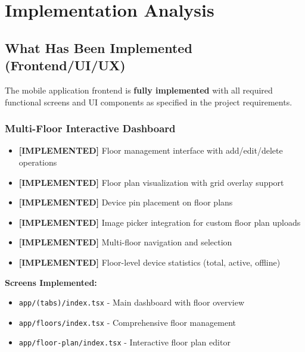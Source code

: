 \documentclass[12pt,a4paper]{article}
\begin{document}
\newpage
\section{Implementation Analysis}

\subsection{What Has Been Implemented (Frontend/UI/UX)}


The mobile application frontend is \textbf{fully implemented} with all required functional screens and UI components as specified in the project requirements.

\subsubsection{Multi-Floor Interactive Dashboard}
\begin{itemize}[leftmargin=*]
    \item \textcolor{implemented}{\textbf{[IMPLEMENTED]}} Floor management interface with add/edit/delete operations
    \item \textcolor{implemented}{\textbf{[IMPLEMENTED]}} Floor plan visualization with grid overlay support
    \item \textcolor{implemented}{\textbf{[IMPLEMENTED]}} Device pin placement on floor plans
    \item \textcolor{implemented}{\textbf{[IMPLEMENTED]}} Image picker integration for custom floor plan uploads
    \item \textcolor{implemented}{\textbf{[IMPLEMENTED]}} Multi-floor navigation and selection
    \item \textcolor{implemented}{\textbf{[IMPLEMENTED]}} Floor-level device statistics (total, active, offline)
\end{itemize}

\textbf{Screens Implemented:}
\begin{itemize}
    \item \texttt{app/(tabs)/index.tsx} - Main dashboard with floor overview
    \item \texttt{app/floors/index.tsx} - Comprehensive floor management
    \item \texttt{app/floor-plan/index.tsx} - Interactive floor plan editor
\end{itemize}
\end{document}
